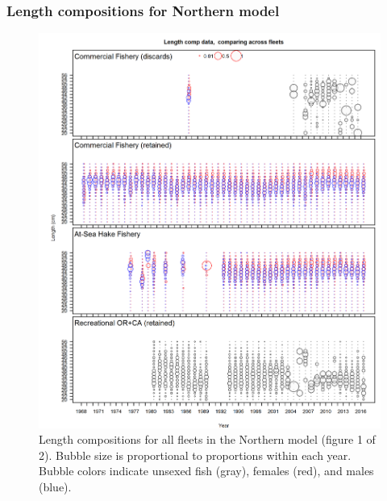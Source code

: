\documentclass[12pt,]{article}
\begin{document}
\FloatBarrier

\newpage

\subsubsection{Length compositions for Northern
model}\label{length-compositions-for-northern-model}

\begin{figure}[htbp]
\centering
\includegraphics{r4ss/plots_mod1/comp_lendat__page1_multi-fleet_comparison.png}
\caption{Length compositions for all fleets in the Northern model
(figure 1 of 2). Bubble size is proportional to proportions within each
year. Bubble colors indicate unsexed fish (gray), females (red), and
males (blue).\label{fig:comp_length_bubble_mod1_page1}}
\end{figure}
\end{document}
